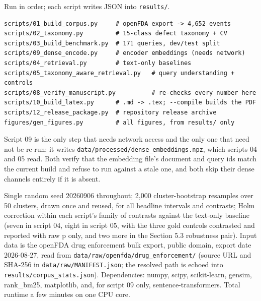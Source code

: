 \documentclass[acmsmall]{acmart}
\begin{document}
Run in order; each script writes JSON into \texttt{results/}.

\par\noindent\begin{minipage}{\linewidth}
\begin{verbatim}
scripts/01_build_corpus.py     # openFDA export -> 4,652 events
scripts/02_taxonomy.py         # 15-class defect taxonomy + CV
scripts/03_build_benchmark.py  # 171 queries, dev/test split
scripts/09_dense_encode.py     # encoder embeddings (needs network)
scripts/04_retrieval.py        # text-only baselines
scripts/05_taxonomy_aware_retrieval.py   # query understanding + controls
scripts/08_verify_manuscript.py          # re-checks every number here
scripts/10_build_latex.py      # .md -> .tex; --compile builds the PDF
scripts/12_release_package.py  # repository release archive
figures/gen_figures.py         # all figures, from results/ only
\end{verbatim}
\end{minipage}

Script 09 is the only step that needs network access and the only one that need not be re-run: it writes \texttt{data/processed/\allowbreak{}dense\_\allowbreak{}embeddings.npz}, which scripts 04 and 05 read. Both verify that the embedding file's document and query ids match the current build and refuse to run against a stale one, and both skip their dense channels entirely if it is absent.

Single random seed 20260906 throughout; 2,000 cluster-bootstrap resamples over 50 clusters, drawn once and reused, for all headline intervals and contrasts; Holm correction within each script's family of contrasts against the text-only baseline (seven in script 04, eight in script 05, with the three gold controls contrasted and reported with raw p only, and two more in the Section 5.3 robustness pair). Input data is the openFDA drug enforcement bulk export, public domain, export date 2026-08-27, read from \texttt{data/raw/\allowbreak{}openfda/\allowbreak{}drug\_\allowbreak{}enforcement/} (source URL and SHA-256 in \texttt{data/raw/\allowbreak{}MANIFEST.json}; the resolved path is echoed into \texttt{results/corpus\_\allowbreak{}stats.json}). Dependencies: numpy, scipy, scikit-learn, gensim, rank\_bm25, matplotlib, and, for script 09 only, sentence-transformers. Total runtime a few minutes on one CPU core.
\end{document}
